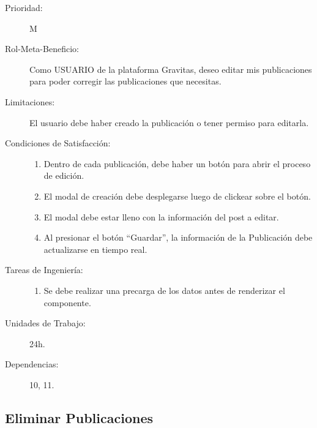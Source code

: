 \begin{description}
    \item[Prioridad:] M
    \item[Rol-Meta-Beneficio:] Como USUARIO de la plataforma Gravitas, deseo  editar mis publicaciones para poder corregir las publicaciones que necesitas.
    \item[Limitaciones:]   El usuario debe haber creado la publicación o tener permiso para editarla.
    \item[Condiciones de Satisfacción:]  \hfill
        \begin{enumerate}
            \item Dentro de cada publicación, debe haber un botón para abrir el proceso de edición.
		    \item El modal de creación debe desplegarse luego de clickear sobre el botón.
		    \item El modal debe estar lleno con la información del post a editar.
		    \item Al presionar el botón “Guardar”, la información de la Publicación debe actualizarse en tiempo real. 
        \end{enumerate}
    \item[Tareas de Ingeniería:]  \hfill
        \begin{enumerate}
            \item Se debe realizar una precarga de los datos antes de renderizar el componente.
        \end{enumerate}
    \item[Unidades de Trabajo:] 24h.
    \item[Dependencias:] 10, 11.
\end{description}

\newpage

\subsection{Eliminar Publicaciones}

